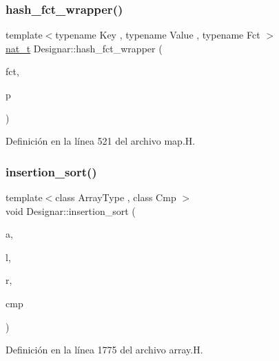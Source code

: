 \subsubsection{\texorpdfstring{hash\+\_\+fct\+\_\+wrapper()}{hash\_fct\_wrapper()}}
{\footnotesize\ttfamily template$<$typename Key , typename Value , typename Fct $>$ \\
\hyperlink{namespace_designar_aa72662848b9f4815e7bf31a7cf3e33d1}{nat\+\_\+t} Designar\+::hash\+\_\+fct\+\_\+wrapper (\begin{DoxyParamCaption}\item[{Fct}]{fct,  }\item[{const \hyperlink{namespace_designar_a7394b1b25278abf7211e77b91eb5204f}{Map\+Key}$<$ Key, Value $>$ \&}]{p }\end{DoxyParamCaption})\hspace{0.3cm}{\ttfamily [inline]}}



Definición en la línea 521 del archivo map.\+H.

\mbox{\label{namespace_designar_a9fec85a7dda46bb4840bf066c8483853}} 
\subsubsection{\texorpdfstring{insertion\+\_\+sort()}{insertion\_sort()}\hspace{0.1cm}{\footnotesize\ttfamily [1/6]}}
{\footnotesize\ttfamily template$<$class Array\+Type , class Cmp $>$ \\
void Designar\+::insertion\+\_\+sort (\begin{DoxyParamCaption}\item[{Array\+Type \&}]{a,  }\item[{\hyperlink{namespace_designar_a9d113d66a39e82b73727c72cd3a52f73}{lint\+\_\+t}}]{l,  }\item[{\hyperlink{namespace_designar_a9d113d66a39e82b73727c72cd3a52f73}{lint\+\_\+t}}]{r,  }\item[{Cmp \&}]{cmp }\end{DoxyParamCaption})}



Definición en la línea 1775 del archivo array.\+H.

\mbox{\label{namespace_designar_ab2f897d6db2113316fee5efcd50a459d}} 
